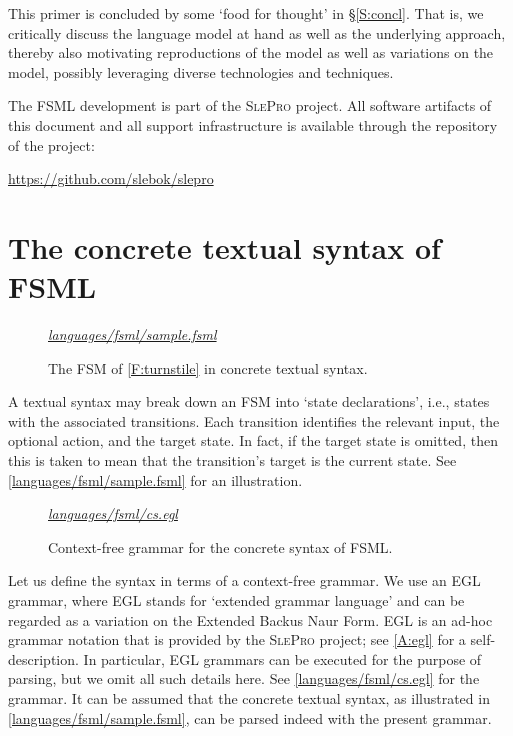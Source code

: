 \documentclass[preprint,authoryear,12pt]{noelsarticle}
\newcommand{\slepro}{\textsc{SlePro}}
\newcommand{\codefigure}[3]{
\begin{figure}[t!]
\begin{boxedminipage}{\hsize}
\mbox{}\hfill{}{\small\textit{\href{http://github.com/slebok/slepro/tree/master/#2}{#2}}}

\end{boxedminipage}
\caption{#1.}
\label{#2}
\medskip
\end{figure}}
\begin{document}
This primer is concluded by some `food for thought' in
\S\ref{S:concl}. That is, we critically discuss the language model at
hand as well as the underlying approach, thereby also motivating
reproductions of the model as well as variations on the model,
possibly leveraging diverse technologies and techniques.

The FSML development is part of the \slepro{} project. All software
artifacts of this document and all support infrastructure is available
through the repository of the project:

\begin{center}
\url{https://github.com/slebok/slepro}
\end{center}


\section{The concrete textual syntax of FSML}
\label{S:textual}

\codefigure{%
The FSM of \autoref{F:turnstile} in concrete textual syntax}{%
languages/fsml/sample.fsml}{%
fsml}

A textual syntax may break down an FSM into `state declarations',
i.e., states with the associated transitions. Each transition
identifies the relevant input, the optional action, and the target
state. In fact, if the target state is omitted, then this is taken to
mean that the transition's target is the current state. See
\autoref{languages/fsml/sample.fsml} for an illustration.

\codefigure{%
Context-free grammar for the concrete syntax of FSML}{%
languages/fsml/cs.egl}{%
egl}

Let us define the syntax in terms of a context-free grammar. We use an
EGL grammar, where EGL stands for `extended grammar language' and can
be regarded as a variation on the Extended Backus Naur Form. EGL is an
ad-hoc grammar notation that is provided by the \slepro{} project; see
\ref{A:egl} for a self-description. In particular, EGL grammars can
be executed for the purpose of parsing, but we omit all such details
here. See \autoref{languages/fsml/cs.egl} for the grammar. It can be
assumed that the concrete textual syntax, as illustrated in
\autoref{languages/fsml/sample.fsml}, can be parsed indeed
with the present grammar.

\end{document}
